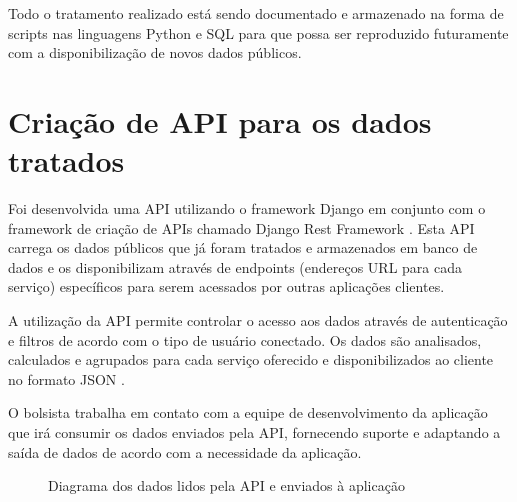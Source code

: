 \documentclass[12pt]{report}
\begin{document}
Todo o tratamento realizado está sendo documentado e armazenado na forma de scripts nas linguagens Python \cite{python} e SQL para que possa ser reproduzido futuramente com a disponibilização de novos dados públicos.

\section{Criação de API para os dados tratados}
Foi desenvolvida uma API \cite{api} utilizando o framework Django \cite{django} em conjunto com o framework de criação de APIs chamado Django Rest Framework \cite{drf}. Esta API carrega os dados públicos que já foram tratados e armazenados em banco de dados e os disponibilizam através de endpoints (endereços URL para cada serviço) específicos para serem acessados por outras aplicações clientes.

A utilização da API permite controlar o acesso aos dados através de autenticação e filtros de acordo com o tipo de usuário conectado. Os dados são analisados, calculados e agrupados para cada serviço oferecido e disponibilizados ao cliente no formato JSON \cite{json}.

O bolsista trabalha em contato com a equipe de desenvolvimento da aplicação que irá consumir os dados enviados pela API, fornecendo suporte e adaptando a saída de dados de acordo com a necessidade da aplicação.


\begin{figure}[h!]
\centering
{}
\caption{Diagrama dos dados lidos pela API e enviados à aplicação}
\label{fig:api}
\end{figure}
\end{document}
